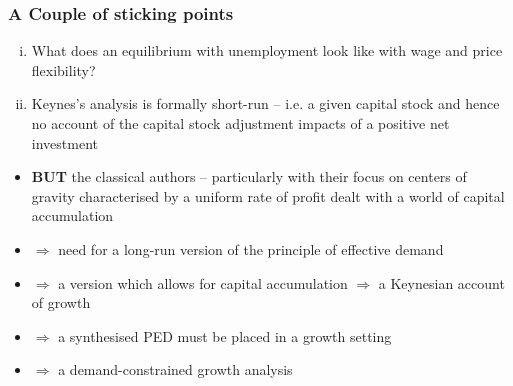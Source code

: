 \documentclass{article}
\begin{document}
\subsubsection{A Couple of sticking points}
	\begin{enumerate}[(i)]
		\item What does an equilibrium with unemployment look like with wage and price flexibility?
		\item Keynes's analysis is formally short-run -- i.e. a given capital stock and hence no account of the capital stock adjustment impacts of a positive net investment
	\end{enumerate}
	\begin{itemize}
		\item \textbf{BUT} the classical authors -- particularly with their focus on centers of gravity characterised by a uniform rate of profit dealt with a world of capital accumulation
		\item \textcolor{myred}{\( \Rightarrow \) need for a long-run version of the principle of effective demand}
		\item \textcolor{myred}{\( \Rightarrow \) a version which allows for capital accumulation \( \Rightarrow \) a Keynesian account of growth}
		\item \( \Rightarrow \) a synthesised PED must be placed in a growth setting
		\item \( \Rightarrow \) a demand-constrained growth analysis
	\end{itemize}
\end{document}
